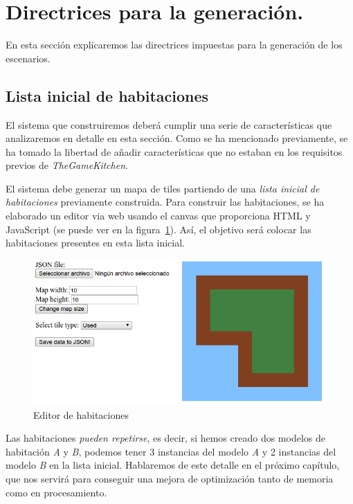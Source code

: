 \section{Directrices para la generación.}

En esta sección explicaremos las directrices impuestas para la generación de los escenarios.


\subsection{Lista inicial de habitaciones}

El sistema que construiremos deberá cumplir una serie de características que analizaremos en detalle en esta sección. Como se ha mencionado previamente, se ha tomado la libertad de añadir características que no estaban en los requisitos previos de \emph{TheGameKitchen}.

El sistema debe generar un mapa de tiles partiendo de una \emph{lista inicial de habitaciones} previamente construida. Para construir las habitaciones, se ha elaborado un editor via web usando el canvas que proporciona HTML y JavaScript (se puede ver en la figura~\ref{fig:roomed}). Así, el objetivo será colocar las habitaciones presentes en esta lista inicial.

\begin{figure}[t]
\centering
\includegraphics[scale=0.5]{img/roomed}
\caption{Editor de habitaciones
\label{fig:roomed}}
\end{figure}

Las habitaciones \emph{pueden repetirse}, es decir, si hemos creado dos modelos de habitación \emph{A} y \emph{B}, podemos tener 3 instancias del modelo \emph{A} y 2 instancias del modelo \emph{B} en la lista inicial. Hablaremos de este detalle en el próximo capítulo, que nos servirá para conseguir una mejora de optimización tanto de memoria como en procesamiento.

